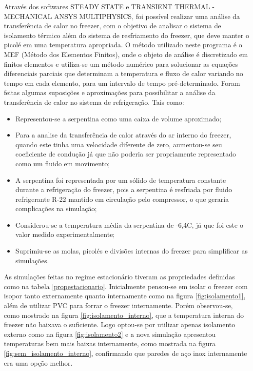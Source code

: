 \begin{itemize}
 Através dos softwares STEADY STATE e TRANSIENT THERMAL - MECHANICAL ANSYS MULTIPHYSICS, foi possível realizar uma análise da transferência de calor no freezer, com o objetivo de analisar o sistema de isolamento térmico além do sistema de resfriamento do freezer, que deve manter o picolé em uma temperatura apropriada. O método utilizado neste programa é o MEF (Método dos Elementos Finitos), onde o objeto de análise é discretizado em finitos elementos e utiliza-se um método numérico para solucionar as equações diferenciais parciais que determinam a temperatura e fluxo de calor variando no tempo em cada elemento, para um intervalo de tempo pré-determinado.
 Foram feitas algumas suposições e aproximações para possibilitar a análise da transferência de calor no sistema de refrigeração. Tais como:
\begin{itemize}
\item Representou-se a serpentina como uma caixa de volume aproximado;
\item Para a analise da transferência de calor através do ar interno do freezer, quando este tinha uma velocidade diferente de zero, aumentou-se seu coeficiente de condução já que não poderia ser propriamente representado como um fluido em movimento;
\item A serpentina foi representada por um sólido de temperatura constante durante a refrigeração do freezer, pois a serpentina é resfriada por fluido refrigerante R-22 mantido em circulação pelo compressor, o que geraria complicações na simulação;
\item Considerou-se a temperatura média da serpentina de -6,4\textdegree C, já que foi este o valor medido experimentalmente;
\item Suprimiu-se as molas, picolés e divisões internas do freezer para simplificar as simulações.
\end{itemize}
 As simulações feitas no regime estacionário tiveram as propriedades definidas como na tabela \ref{propestacionario}. Inicialmente pensou-se em isolar o freezer com isopor tanto externamente quanto internamente como na figura \ref{fig:isolamento1}, além de utilizar PVC para forrar o freezer internamente. Porém observou-se, como mostrado na figura \ref{fig:isolamento_interno}, que a temperatura interna do freezer não baixava o suficiente. Logo optou-se por utilizar apenas isolamento externo como na figura \ref{fig:isolamento2} e a nova simulação apresentou temperaturas bem mais baixas internamente, como mostrada na figura \ref{fig:sem_isolamento_interno}, confirmando que paredes de aço inox internamente era uma opção melhor.


\end{itemize}
